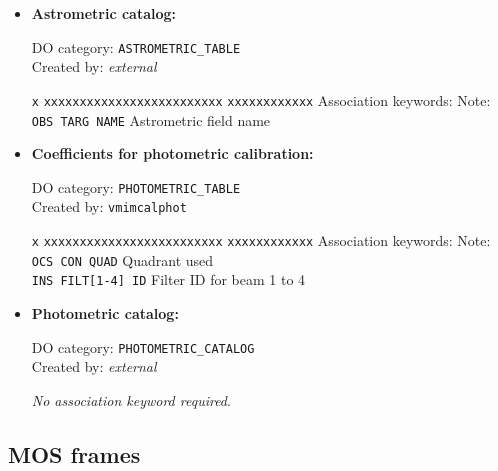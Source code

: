 \begin{itemize}
\item {\bf Astrometric catalog:}

DO category: {\tt ASTROMETRIC\_TABLE} \\
Created by: {\it external}

\begin{tabbing}
{\tt x} \= {\tt xxxxxxxxxxxxxxxxxxxxxxxxx} \= {\tt xxxxxxxxxxxx} \kill
\> Association keywords: \> Note: \\
\> {\tt OBS TARG NAME} \> Astrometric field name \\
\end{tabbing}

\item {\bf Coefficients for photometric calibration:}

DO category: {\tt PHOTOMETRIC\_TABLE} \\
Created by: {\tt vmimcalphot}

\begin{tabbing}
{\tt x} \= {\tt xxxxxxxxxxxxxxxxxxxxxxxxx} \= {\tt xxxxxxxxxxxx} \kill
\> Association keywords: \> Note: \\
\> {\tt OCS CON QUAD} \> Quadrant used \\
\> {\tt INS FILT[1-4] ID} \> Filter ID for beam 1 to 4 \\
\end{tabbing}

\item {\bf Photometric catalog:} 

DO category: {\tt PHOTOMETRIC\_CATALOG} \\
Created by: {\it external}

{\it No association keyword required}.

\end{itemize}

\subsection{MOS frames}
\label{DATA:PRODMOS}

